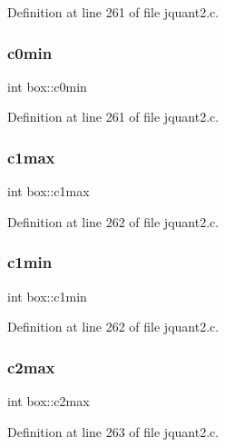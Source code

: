 Definition at line 261 of file jquant2.\+c.

\mbox{\label{structbox_acf78968f99d9730f516003fc77a60f07}} 
\subsubsection{\texorpdfstring{c0min}{c0min}}
{\footnotesize\ttfamily int box\+::c0min}



Definition at line 261 of file jquant2.\+c.

\mbox{\label{structbox_a5313694dbee838c7f4d5f409e954460e}} 
\subsubsection{\texorpdfstring{c1max}{c1max}}
{\footnotesize\ttfamily int box\+::c1max}



Definition at line 262 of file jquant2.\+c.

\mbox{\label{structbox_a81563b63e4a79ca40bdfeacf5070a6d9}} 
\subsubsection{\texorpdfstring{c1min}{c1min}}
{\footnotesize\ttfamily int box\+::c1min}



Definition at line 262 of file jquant2.\+c.

\mbox{\label{structbox_a1fe5b5ab81ed7e8e3f104deb168576cd}} 
\subsubsection{\texorpdfstring{c2max}{c2max}}
{\footnotesize\ttfamily int box\+::c2max}



Definition at line 263 of file jquant2.\+c.

\mbox{\label{structbox_a781a101c49c5e4a789967569994d924d}} 
